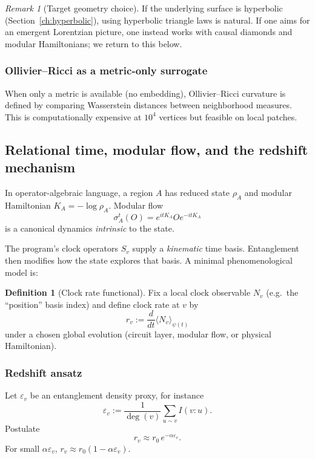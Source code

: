 \documentclass[11pt,oneside]{amsbook}
\numberwithin{equation}{section}
\theoremstyle{plain}
\theoremstyle{definition}
\newtheorem{definition}[theorem]{Definition}
\theoremstyle{remark}
\newtheorem{remark}[theorem]{Remark}
\begin{document}
\begin{remark}[Target geometry choice]
If the underlying surface is hyperbolic (Section~\ref{ch:hyperbolic}), using hyperbolic triangle laws is natural.
If one aims for an emergent Lorentzian picture, one instead works with causal diamonds and modular Hamiltonians; we return to this below.
\end{remark}

\subsubsection{Ollivier--Ricci as a metric-only surrogate}
When only a metric is available (no embedding), Ollivier--Ricci curvature is defined by comparing Wasserstein distances between neighborhood measures.
This is computationally expensive at $10^4$ vertices but feasible on local patches.

\subsection{Relational time, modular flow, and the redshift mechanism}
\label{sec:relational_time}

In operator-algebraic language, a region $A$ has reduced state $\rho_A$ and modular Hamiltonian $K_A=-\log\rho_A$.
Modular flow
\[
\sigma_A^t(O)=e^{itK_A}Oe^{-itK_A}
\]
is a canonical dynamics \emph{intrinsic} to the state.

The program's clock operators $S_v$ supply a \emph{kinematic} time basis.
Entanglement then modifies how the state explores that basis.
A minimal phenomenological model is:

\begin{definition}[Clock rate functional]
Fix a local clock observable $N_v$ (e.g.\ the ``position'' basis index) and define clock rate at $v$ by
\[
r_v := \frac{d}{dt}\langle N_v\rangle_{\psi(t)}
\]
under a chosen global evolution (circuit layer, modular flow, or physical Hamiltonian).
\end{definition}

\subsubsection{Redshift ansatz}
Let $\varepsilon_v$ be an entanglement density proxy, for instance
\[
\varepsilon_v := \frac{1}{\deg(v)}\sum_{u\sim v} I(v\!:\!u).
\]
Postulate
\begin{equation}
\label{eq:redshift_ansatz}
r_v \approx r_0\,e^{-\alpha \varepsilon_v}.
\end{equation}
For small $\alpha\varepsilon_v$, $r_v\approx r_0(1-\alpha\varepsilon_v)$.
\end{document}
